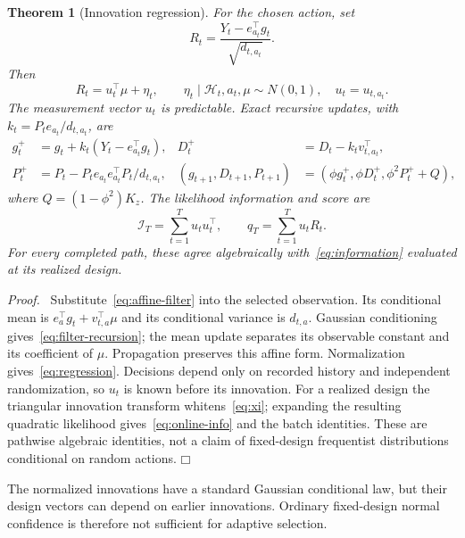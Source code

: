 \documentclass[11pt]{article}
\newtheorem{theorem}{Theorem}
\newenvironment{proof}{\par\noindent\textit{Proof.}\ }{\hfill$\mdlgwhtsquare$\par\medskip}
\begin{document}
\begin{theorem}[Innovation regression]
For the chosen action, set
\begin{equation}
R_t=\frac{Y_t-e_{a_t}^\top g_t}{\sqrt{d_{t,a_t}}}.
\end{equation}
Then
\begin{equation}
\boxed{R_t=u_t^\top\mu+\eta_t,\qquad
\eta_t\mid\mathcal H_t,a_t,\mu\sim N(0,1),\quad u_t=u_{t,a_t}.}
\label{eq:regression}
\end{equation}
The measurement vector $u_t$ is predictable. Exact recursive updates, with $k_t=P_te_{a_t}/d_{t,a_t}$, are
\begin{align}
g_t^+&=g_t+k_t(Y_t-e_{a_t}^\top g_t),&
D_t^+&=D_t-k_tv_{t,a_t}^\top,\nonumber\\
P_t^+&=P_t-P_te_{a_t}e_{a_t}^\top P_t/d_{t,a_t},&
(g_{t+1},D_{t+1},P_{t+1})&=(\phi g_t^+,\phi D_t^+,\phi^2P_t^++Q),
\label{eq:filter-recursion}
\end{align}
where $Q=(1-\phi^2)K_z$. The likelihood information and score are
\begin{equation}
\mathcal I_T=\sum_{t=1}^T u_tu_t^\top,\qquad
q_T=\sum_{t=1}^T u_tR_t.
\label{eq:online-info}
\end{equation}
For every completed path, these agree algebraically with~\eqref{eq:information} evaluated at its realized design.
\end{theorem}
\begin{proof}
Substitute~\eqref{eq:affine-filter} into the selected observation. Its conditional mean is $e_a^\top g_t+v_{t,a}^\top\mu$ and its conditional variance is $d_{t,a}$. Gaussian conditioning gives~\eqref{eq:filter-recursion}; the mean update separates its observable constant and its coefficient of $\mu$. Propagation preserves this affine form. Normalization gives~\eqref{eq:regression}. Decisions depend only on recorded history and independent randomization, so $u_t$ is known before its innovation. For a realized design the triangular innovation transform whitens~\eqref{eq:xi}; expanding the resulting quadratic likelihood gives~\eqref{eq:online-info} and the batch identities. These are pathwise algebraic identities, not a claim of fixed-design frequentist distributions conditional on random actions.
\end{proof}

The normalized innovations have a standard Gaussian conditional law, but their design vectors can depend on earlier innovations. Ordinary fixed-design normal confidence is therefore not sufficient for adaptive selection.
\end{document}
